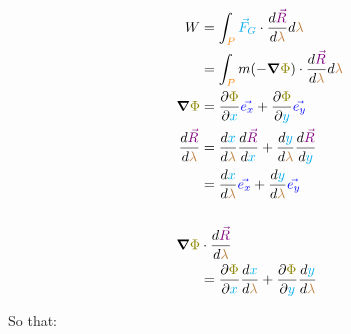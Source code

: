 \begin{align*}
    W &= \int_{\begingroup\color{orange}P\endgroup} \begingroup\color{cyan}\vec{F}_G\endgroup \cdot \frac{d\begingroup\color{violet}\vec{R}\endgroup}{d\begingroup\color{brown}\lambda\endgroup} d\begingroup\color{brown}\lambda\endgroup\\
    &= \int_{\begingroup\color{orange}P\endgroup} m(-\grad{\begingroup\color{olive}\Phi\endgroup}) \cdot \frac{d\begingroup\color{violet}\vec{R}\endgroup}{d\begingroup\color{brown}\lambda\endgroup} d\begingroup\color{brown}\lambda\endgroup\\
    \grad{\begingroup\color{olive}\Phi\endgroup} &= \frac{\partial \begingroup\color{olive}\Phi\endgroup}{\partial \begingroup\color{cyan}x\endgroup} \begingroup\color{blue}\vec{e_x}\endgroup + \frac{\partial \begingroup\color{olive}\Phi\endgroup}{\partial \begingroup\color{cyan}y\endgroup} \begingroup\color{blue}\vec{e_y}\endgroup\\
    \frac{d\begingroup\color{violet}\vec{R}\endgroup}{d\begingroup\color{brown}\lambda\endgroup} &= 
    \frac{d\begingroup\color{cyan}x\endgroup}{d\begingroup\color{brown}\lambda\endgroup} \frac{d\begingroup\color{violet}\vec{R}\endgroup}{d\begingroup\color{cyan}x\endgroup} +
    \frac{d\begingroup\color{cyan}y\endgroup}{d\begingroup\color{brown}\lambda\endgroup} \frac{d\begingroup\color{violet}\vec{R}\endgroup}{d\begingroup\color{cyan}y\endgroup}\\
    &= \frac{d\begingroup\color{cyan}x\endgroup}{d\begingroup\color{brown}\lambda\endgroup} \begingroup\color{blue}\vec{e_x}\endgroup + \frac{d\begingroup\color{cyan}y\endgroup}{d\begingroup\color{brown}\lambda\endgroup}\begingroup\color{blue}\vec{e_y}\endgroup\\\\
    \grad{\begingroup\color{olive}\Phi\endgroup} &\cdot \frac{d\begingroup\color{violet}\vec{R}\endgroup}{d\begingroup\color{brown}\lambda\endgroup}\\
    &= \frac{\partial \begingroup\color{olive}\Phi\endgroup}{\partial \begingroup\color{cyan}x\endgroup}\frac{d\begingroup\color{cyan}x\endgroup}{d\begingroup\color{brown}\lambda\endgroup} +
     \frac{\partial \begingroup\color{olive}\Phi\endgroup}{\partial \begingroup\color{cyan}y\endgroup}\frac{d\begingroup\color{cyan}y\endgroup}{d\begingroup\color{brown}\lambda\endgroup}
\end{align*}

So that:

